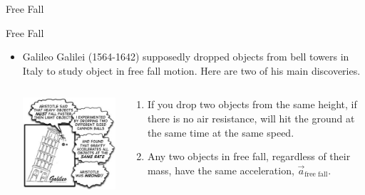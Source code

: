 \documentclass{beamer}
\newcommand{\red}[1]{{\color{red}{#1}}}
\begin{document}
\begin{frame}{Free Fall}
\begin{center}
   \color{blue}{\Huge FREE FALL MOTION!}
\end{center}
\end{frame}

\begin{frame}{Free Fall}
\begin{itemize}
   \item Galileo Galilei (1564-1642) supposedly dropped objects from bell towers in Italy to study object in free fall motion. Here are two of his main discoveries.
   \begin{columns}
   \begin{column}{0.5\textwidth}
   \begin{center}
      \includegraphics[width=\textwidth]{../figures/galileo_tower.jpg}
   \end{center}
   \end{column}
   \begin{column}{0.5\textwidth}
   \begin{enumerate}
      \item If you drop two objects from the same height, if there is no air resistance, will hit the ground at the same time at the same speed.
      \item Any two objects in free fall, regardless of their mass, have the same acceleration, $\vec{a}_{\text{free fall}}$.
   \end{enumerate}
   \uncover<2>{\red{What about a feather and a bowling ball?}}
   \end{column}
   \end{columns}
\end{itemize}
\end{frame}
\end{document}
